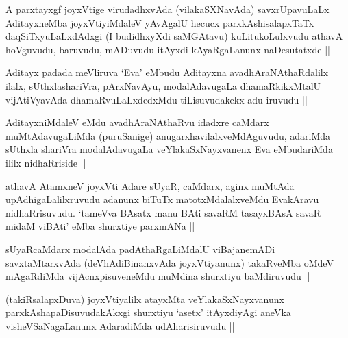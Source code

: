 \begin{artha}
A parxtayxgf joyxVtige virudadhxvAda (vilakaSXNavAda) savxrUpavuLaLx AditayxneMba joyxVtiyiMdaleV yAvAgalU hecucx parxkAshisalapxTaTx daqSiTxyuLaLxdAdxgi (I budidhxyXdi saMGAtavu) kuLitukoLulxvudu athavA hoVguvudu, baruvudu, mADuvudu itAyxdi kAyaRgaLanunx naDesutatxde ||
\end{artha}

\begin{artha}
Aditayx padada meVliruva `Eva' eMbudu Aditayxna avadhAraNAthaRdalilx ilalx, sUthxlashariVra, pArxNavAyu, modalAdavugaLa dhamaRkikxMtalU \footnotemark[1]vijAtiVyavAda dhamaRvuLaLxdedxMdu tiLisuvudakekx adu iruvudu ||
\end{artha}

\begin{artha}
AditayxniMdaleV eMdu avadhAraNAthaRvu idadxre caMdarx muMtAdavugaLiMda (puruSanige) anugarxhavilalxveMdAguvudu, adariMda sUthxla shariVra modalAdavugaLa veYlakaSxNayxvanenx Eva eMbudariMda ililx nidhaRriside ||
\end{artha}

\begin{artha}
athavA AtamxneV joyxVti Adare sUyaR, caMdarx, aginx muMtAda upAdhigaLalilxruvudu adanunx biTuTx matotxMdalalxveMdu EvakAravu nidhaRrisuvudu. `tameVva BAsatx manu BAti savaRM tasayxBAsA savaR midaM viBAti' eMba shurxtiye parxmANa ||
\end{artha}

\begin{artha}
sUyaRcaMdarx modalAda padAthaRgaLiMdalU viBajanemADi savxtaMtarxvAda (deVhAdiBinanxvAda joyxVtiyanunx) takaRveMba oMdeV mAgaRdiMda vijAcnxpisuveneMdu muMdina shurxtiyu baMdiruvudu ||
\end{artha}

\begin{artha}
(takiRsalapxDuva) joyxVtiyalilx atayxMta veYlakaSxNayxvanunx parxkAshapaDisuvudakAkxgi shurxtiyu `asetx' itAyxdiyAgi aneVka visheVSaNagaLanunx AdaradiMda udAharisiruvudu ||
\end{artha}

